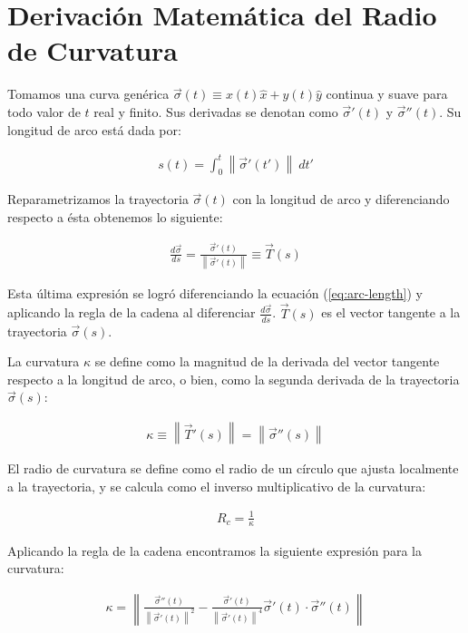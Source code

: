\appendix
\newcommand{\norm}[1]{\left\lVert#1\right\rVert}
\section{Derivación Matemática del Radio de Curvatura}
\label{app:math-curvature radius}

Tomamos una curva genérica $\vec{\sigma}(t) \equiv x(t) \hat{x} + y(t) \hat{y}$ continua y suave para todo valor de $t$ real y finito.
Sus derivadas se denotan como $\vec{\sigma}'(t)$ y $\vec{\sigma}''(t)$. Su longitud de arco está dada por:

\begin{align}
  s(t) = \int^t_0 \norm{\vec{\sigma}'(t')}~dt' \label{eq:arc-length}
\end{align}

Reparametrizamos la trayectoria $\vec{\sigma}(t)$ con la longitud de arco y diferenciando respecto a ésta obtenemos lo siguiente:

\begin{align}
  \frac{d\vec{\sigma}}{ds} = \frac{\vec{\sigma}'(t)}{\norm{\vec{\sigma}'(t)}} \equiv \vec{T}(s)
\end{align}

Esta última expresión se logró diferenciando la ecuación (\ref{eq:arc-length}) y aplicando la regla de la cadena al diferenciar
$\frac{d\vec{\sigma}}{ds}$. $\vec{T}(s)$ es el vector tangente a la trayectoria $\vec{\sigma}(s)$.

La curvatura $\kappa$ se define como la magnitud de la derivada del vector tangente respecto a la longitud de arco, o bien, como la
segunda derivada de la trayectoria $\vec{\sigma}(s)$:

\begin{align}
  \kappa \equiv \norm{\vec{T}'(s)} = \norm{\vec{\sigma}''(s)} 
\end{align}

El radio de curvatura se define como el radio de un círculo que ajusta localmente a la trayectoria, y se calcula como el inverso
multiplicativo de la curvatura:

\begin{align}
  R_c = \frac{1}{\kappa}
\end{align}

Aplicando la regla de la cadena encontramos la siguiente expresión para la curvatura:

\begin{align}
  \kappa = \norm{\frac{\vec{\sigma}''(t)}{\norm{\vec{\sigma}'(t)}^2} - \frac{\vec{\sigma}'(t)}{\norm{\vec{\sigma}'(t)}^4}
  \vec{\sigma}'(t)\cdot\vec{\sigma}''(t)} \label{eq:curvature}
\end{align}

